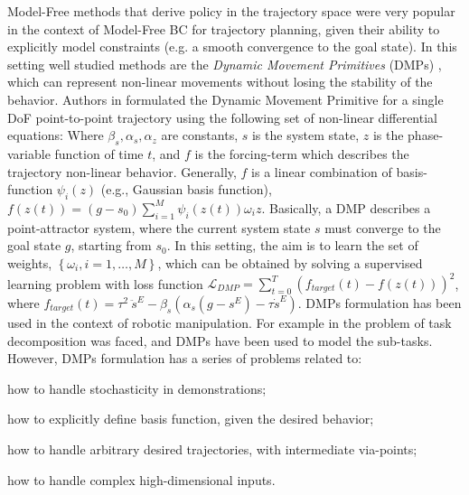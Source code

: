 Model-Free methods that derive policy in the trajectory space were very popular in the context of Model-Free BC for trajectory planning, given their ability to explicitly model constraints (e.g. a smooth convergence to the goal state). In this setting well studied methods are the \textit{Dynamic Movement Primitives} (DMPs) \cite{ijspeert2002learning,ijspeert2013dynamical}, which can represent non-linear movements without losing the stability of the behavior.  
Authors in \cite{ijspeert2013dynamical} formulated the Dynamic Movement Primitive for a single DoF point-to-point trajectory using the following set of non-linear differential equations:  Where $\beta_{s}, \alpha_{s}, \alpha_{z}$ are constants, $s$ is the system state, $z$ is the phase-variable function of time $t$, and $f$ is the forcing-term which describes the trajectory non-linear behavior. Generally, $f$ is a linear combination of basis-function $\psi_{i}(z)$ (e.g., Gaussian basis function), $f(z(t)) = (g-s_{0}) \sum_{i=1}^{M}\psi_{i}(z(t))\omega_{i}z$. Basically, a DMP describes a point-attractor system, where the current system state $s$ must converge to the goal state $g$, starting from $s_{0}$. In this setting, the aim is to learn the set of weights, $\left\{\omega_{i}, i=1,\dots,M\right\}$, which can be obtained by solving a supervised learning problem with loss function $\mathcal{L}_{DMP} = \sum_{t=0}^{T}(f_{target}(t) - f(z(t)))^{2}$, where $f_{target}(t) = \tau^{2} \ \ddot{s}^{E} - \beta_{s}(\alpha_{s}(g - s^{E})-\tau \dot{s}^{E})$. DMPs formulation has been used in the context of robotic manipulation. For example in \cite{meier2011movement_primitive,caccavale2019kinesthetic,agostini2020manipulation} the problem of task decomposition was faced, and DMPs have been used to model the sub-tasks. However, DMPs formulation has a series of problems related to: \begin{enumerate*}[label=(\textbf{\alph*})]
    \item how to handle stochasticity in demonstrations;
    \item how to explicitly define basis function, given the desired behavior;
    \item how to handle arbitrary desired trajectories, with intermediate via-points;
    \item how to handle complex high-dimensional inputs. 
\end{enumerate*}
